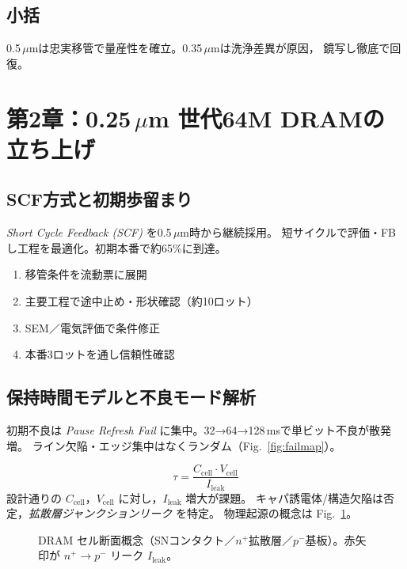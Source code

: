 \documentclass[conference]{IEEEtran}
\begin{document}
\subsection{小括}
0.5\,$\mu$mは忠実移管で量産性を確立。0.35\,$\mu$mは洗浄差異が原因，
鏡写し徹底で回復。

\section{第2章：0.25\,\texorpdfstring{$\mu$m}{μm} 世代64M DRAMの立ち上げ}
\subsection{SCF方式と初期歩留まり}
\emph{Short Cycle Feedback (SCF)} を0.5\,$\mu$m時から継続採用。
短サイクルで評価・FBし工程を最適化。初期本番で約65\%に到達。
\begin{enumerate}
  \item 移管条件を流動票に展開
  \item 主要工程で途中止め・形状確認（約10ロット）
  \item SEM／電気評価で条件修正
  \item 本番3ロットを通し信頼性確認
\end{enumerate}

\subsection{保持時間モデルと不良モード解析}
初期不良は \emph{Pause Refresh Fail} に集中。32→64→128\,msで単ビット不良が散発増。
ライン欠陥・エッジ集中はなくランダム（Fig.~\ref{fig:failmap}）。

\begin{equation}
\tau=\frac{C_{\mathrm{cell}}\cdot V_{\mathrm{cell}}}{I_{\mathrm{leak}}}
\end{equation}
設計通りの $C_{\mathrm{cell}}$，$V_{\mathrm{cell}}$ に対し，$I_{\mathrm{leak}}$ 増大が課題。
キャパ誘電体/構造欠陥は否定，\emph{拡散層ジャンクションリーク} を特定。
物理起源の概念は Fig.~\ref{fig:dram_cross_section}。

\begin{figure}[t]\centering
{}
\caption{DRAM セル断面概念（SNコンタクト／$n^+$拡散層／$p^-$基板）。赤矢印が $n^+\!\rightarrow\!p^-$ リーク $I_{\mathrm{leak}}$。}
\label{fig:dram_cross_section}
\end{figure}
\end{document}
